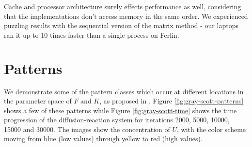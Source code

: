 \documentclass[a4paper,11pt]{article}
\begin{document}
Cache and processor architecture surely effects performance as well, considering that the implementations don't access memory in the same order. We experienced puzzling results with the sequential version of the matrix method - our laptops ran it up to 10 times faster than a single process on Ferlin.  


\section*{Patterns}

We demonstrate some of the pattern classes which occur at different locations in the parameter space of $F$ and $K$, as proposed in \cite{Pearson}. Figure \ref{fig:gray-scott-patterns} shows a few of these patterns while Figure \ref{fig:gray-scott-time} shows the time progression of the diffusion-reaction system for iterations 2000, 5000, 10000, 15000 and 30000. The images show the concentration of $U$, with the color scheme moving from blue (low values) through yellow to red (high values). 
\end{document}
